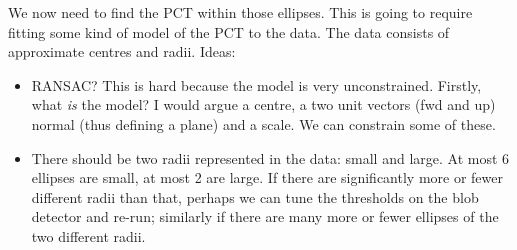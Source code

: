 We now need to find the PCT within those ellipses. This is going to require fitting some kind of
model of the PCT to the data. The data consists of approximate centres and radii. 
Ideas:
\begin{itemize}
\item RANSAC? This is hard because the model is very unconstrained. Firstly, what \emph{is} the
model? I would argue a centre, a two unit vectors (fwd and up) normal (thus defining a plane) and a scale.
We can constrain some of these.
\item There should be two radii represented in the data: small and large. At most 6 ellipses are small, at most
2 are large. If there are significantly more or fewer different radii than that, perhaps we can tune the thresholds on the blob
detector and re-run; similarly if there are many more or fewer ellipses of the two different radii.
\end{itemize}




